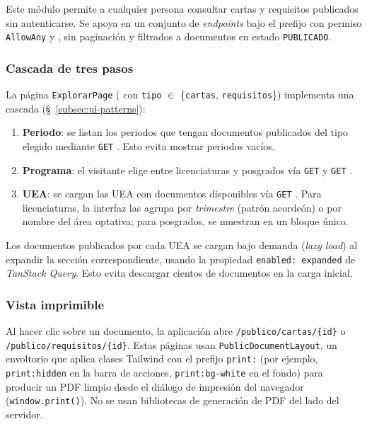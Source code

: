 Este módulo permite a cualquier persona consultar cartas y requisitos publicados sin autenticarse. Se apoya en un conjunto de \emph{endpoints} bajo el prefijo  con permiso \texttt{AllowAny} y , sin paginación y filtrados a documentos en estado \texttt{PUBLICADO}.

\subsubsection{Cascada de tres pasos}

La página \texttt{ExplorarPage} ( con \texttt{tipo} $\in$ \{\texttt{cartas}, \texttt{requisitos}\}) implementa una cascada (\S~\ref{subsec:ui-patterns}):

\begin{enumerate}
    \item \textbf{Periodo}: se listan los periodos que tengan documentos publicados del tipo elegido mediante \texttt{GET} . Esto evita mostrar periodos vacíos.
    \item \textbf{Programa}: el visitante elige entre licenciaturas y posgrados vía \texttt{GET}  y \texttt{GET} .
    \item \textbf{UEA}: se cargan las UEA con documentos disponibles vía \texttt{GET} . Para licenciaturas, la interfaz las agrupa por \emph{trimestre} (patrón acordeón) o por nombre del área optativa; para posgrados, se muestran en un bloque único.
\end{enumerate}

Los documentos publicados por cada UEA se cargan bajo demanda (\emph{lazy load}) al expandir la sección correspondiente, usando la propiedad \texttt{enabled: expanded} de \emph{TanStack Query}. Esto evita descargar cientos de documentos en la carga inicial.

\subsubsection{Vista imprimible}

Al hacer clic sobre un documento, la aplicación abre \texttt{/publico/cartas/\{id\}} o \texttt{/publico/requisitos/\{id\}}. Estas páginas usan \texttt{PublicDocumentLayout}, un envoltorio que aplica clases Tailwind con el prefijo \texttt{print:} (por ejemplo, \texttt{print:hidden} en la barra de acciones, \texttt{print:bg-white} en el fondo) para producir un PDF limpio desde el diálogo de impresión del navegador (\texttt{window.print()}). No se usan bibliotecas de generación de PDF del lado del servidor.

